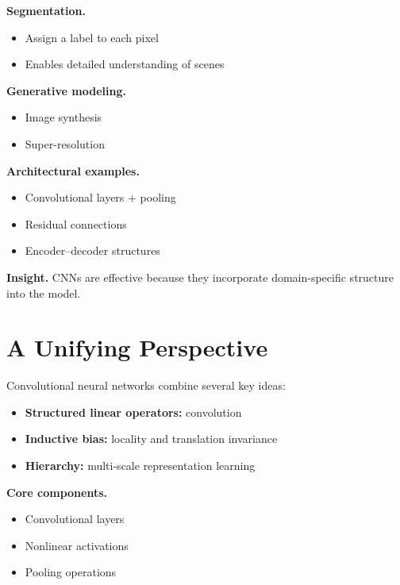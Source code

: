 \medskip

\noindent
\textbf{Segmentation.}
\begin{itemize}
    \item Assign a label to each pixel
    \item Enables detailed understanding of scenes
\end{itemize}

\medskip

\noindent
\textbf{Generative modeling.}
\begin{itemize}
    \item Image synthesis
    \item Super-resolution
\end{itemize}

\medskip

\noindent
\textbf{Architectural examples.}
\begin{itemize}
    \item Convolutional layers + pooling
    \item Residual connections
    \item Encoder--decoder structures
\end{itemize}

\medskip

\noindent
\textbf{Insight.}  
CNNs are effective because they incorporate domain-specific structure into the model.

\section{A Unifying Perspective}

Convolutional neural networks combine several key ideas:

\begin{itemize}
    \item \textbf{Structured linear operators:} convolution
    \item \textbf{Inductive bias:} locality and translation invariance
    \item \textbf{Hierarchy:} multi-scale representation learning
\end{itemize}

\medskip

\noindent
\textbf{Core components.}
\begin{itemize}
    \item Convolutional layers
    \item Nonlinear activations
    \item Pooling operations
\end{itemize}


